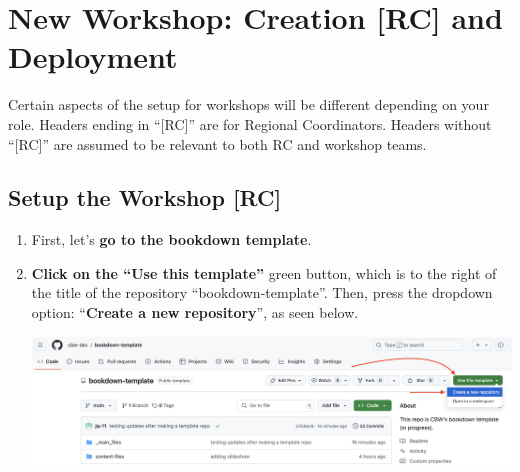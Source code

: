 \documentclass[
]{book}
\theoremstyle{definition}
\theoremstyle{definition}
\theoremstyle{definition}
\theoremstyle{definition}
\theoremstyle{remark}
\begin{document}
\chapter{\texorpdfstring{\textbf{New Workshop}: Creation {[}RC{]} and Deployment}{New Workshop: Creation {[}RC{]} and Deployment}}\label{new-workshop-create-deploy}

Certain aspects of the setup for workshops will be different depending on your role. Headers ending in ``{[}RC{]}'' are for Regional Coordinators. Headers without ``{[}RC{]}'' are assumed to be relevant to both RC and workshop teams.

\section{Setup the Workshop {[}RC{]}}\label{rc-workshop-setup}

\begin{enumerate}
\def\labelenumi{\arabic{enumi}.}
\item
  First, let's \textbf{go to the bookdown template}.
\item
  \textbf{Click on the ``Use this template''} green button, which is to the right of the title of the repository ``bookdown-template''. Then, press the dropdown option: ``\textbf{Create a new repository}'', as seen below.

  \includegraphics{img/template/make-a-template.png}\\
\end{enumerate}
\end{document}
